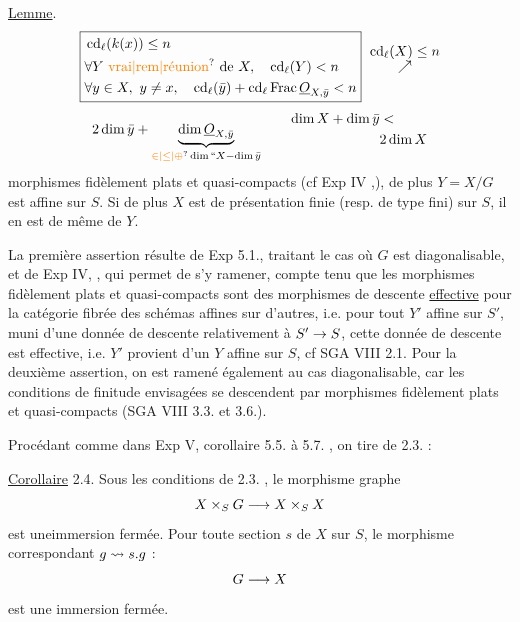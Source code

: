 \uline{Lemme}.
\[
\boxed{\begin{aligned}
&\operatorname{cd}_{\ell}(k(x))\leq n\\
&\forall Y\ \text{\unsure{vrai|rem|réunion} de } X,\quad \operatorname{cd}_{\ell}(Y)<n\\
&\forall y\in X,\ y\ne x,\quad \operatorname{cd}_{\ell}(\bar y)+\operatorname{cd}_{\ell}\operatorname{Frac}\underline O_{X,\bar y}<n
\end{aligned}}\ \overset{\displaystyle\operatorname{cd}_{\ell}(X)\leq n}{\nearrow}
\]
\[
2\dim\bar y+\underbrace{\dim\underline O_{X,\bar y}}_{\unsure{\in|\leq|\oplus}\dim\text{“}X-\dim\bar y}\qquad
\begin{aligned}\dim X+\dim\bar y&<\\&2\dim X\end{aligned}
\]
morphismes fidèlement plats et quasi-compacts (cf Exp IV ,), de plus
$Y=X/G$ est affine sur $S$. Si de plus $X$ est de présentation finie (resp.
de type fini) sur $S$, il en est de même de $Y$.

La première assertion résulte de Exp  5.1.,  traitant le cas où
$G$ est diagonalisable, et de Exp IV, , qui permet de s'y ramener, compte
tenu que les morphismes fidèlement plats et quasi-compacts  sont des morphismes de descente \uline{effective} pour la catégorie fibrée des schémas affines sur
d'autres, i.e. pour tout $Y'$ affine sur $S'$, muni d'une donnée de descente
relativement à $S'\to S$, cette donnée de descente est effective, i.e. $Y'$
provient d'un $Y$ affine sur $S$, cf SGA VIII\deleted{\unsure{,}} 2.1. Pour la deuxième assertion, on est ramené également au cas diagonalisable, car les conditions de
finitude envisagées se descendent par morphismes fidèlement plats et
quasi-compacts  (SGA VIII 3.3. et 3.6.). 

Procédant comme dans Exp V, corollaire 5.5.
à 5.7. , on tire de 2.3. :

\uline{Corollaire} 2.4. Sous les conditions de 2.3. , le morphisme graphe
\[
X\times_S G\longrightarrow X\times_S X
\]
est une\handwritten{\unsure{/}}immersion fermée. Pour toute section $s$ de $X$ sur $S$, le morphisme
correspondant $g\leadsto s.g$ :
\[
G\longrightarrow X
\]
est une immersion fermée.

